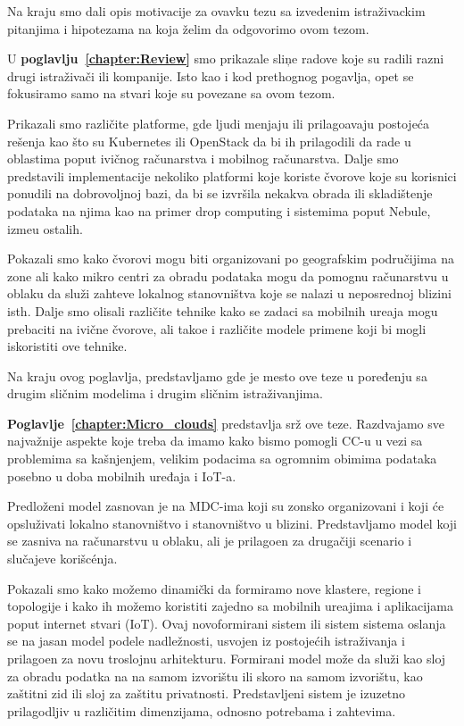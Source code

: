 Na kraju smo dali opis motivacije za ovavku tezu sa izvedenim istra\v zivackim pitanjima i hipotezama na koja \v zelim da odgovorimo ovom tezom.

U \textbf{poglavlju~\ref{chapter:Review}} smo prikazale sli\c ne radove koje su radili razni drugi istra\v ziva\v ci ili kompanije. Isto kao i kod prethognog pogavlja, opet se fokusiramo samo na stvari koje su povezane sa ovom tezom.

Prikazali smo razli\v cite platforme, gde ljudi menjaju ili prilago\dj avaju postoje\'ca re\v senja kao \v sto su Kubernetes ili OpenStack da bi ih prilagodili da rade u oblastima poput ivi\v cnog ra\v cunarstva i mobilnog ra\v cunarstva. Dalje smo predstavili implementacije nekoliko platformi koje koriste \v cvorove koje su korisnici ponudili na dobrovoljnoj bazi, da bi se izvr\v sila nekakva obrada ili skladi\v stenje podataka na njima kao na primer drop computing i sistemima poput Nebule, izme\dj u ostalih.

Pokazali smo kako \v cvorovi mogu biti organizovani po geografskim podru\v cijima na zone ali kako mikro centri za obradu podataka mogu da pomognu ra\v cunarstvu u oblaku da slu\v zi zahteve lokalnog stanovni\v stva koje se nalazi u neposrednoj blizini isth. Dalje smo olisali razli\v cite tehnike kako se zadaci sa mobilnih ure\dj aja mogu prebaciti na ivi\v cne \v cvorove, ali tako\dj e i razli\v cite modele primene koji bi mogli iskoristiti ove tehnike.

Na kraju ovog poglavlja, predstavljamo gde je mesto ove teze u poređ\dj enju sa drugim sli\v cnim modelima i drugim sli\v cnim istra\v zivanjima.

\textbf{Poglavlje~\ref{chapter:Micro_clouds}} predstavlja sr\v z ove teze. Razdvajamo sve najvažnije aspekte koje treba da imamo kako bismo pomogli CC-u u vezi sa problemima sa kašnjenjem, velikim podacima sa ogromnim obimima podataka posebno u doba mobilnih uređaja i IoT-a.

Predlo\v zeni model zasnovan je na MDC-ima koji su zonsko organizovani i koji \'ce opslu\v zivati lokalno stanovni\v stvo i stanovni\v stvo u blizini. Predstavljamo model koji se zasniva na ra\v cunarstvu u oblaku, ali je prilago\dj en za druga\v ciji scenario i slu\v cajeve kori\v sc\'enja.

Pokazali smo kako mo\v zemo dinami\v cki da formiramo nove klastere, regione i topologije i kako ih možemo koristiti zajedno sa mobilnih ure\dj ajima i aplikacijama poput internet stvari (IoT). Ovaj novoformirani sistem ili sistem sistema oslanja se na jasan model podele nadle\v znosti, usvojen iz postojećih istra\v zivanja i prilago\dj en za novu troslojnu arhitekturu. Formirani model mo\v ze da slu\v zi kao sloj za obradu podatka na na samom izvori\v stu ili skoro na samom izvori\v stu, kao za\v stitni zid ili sloj za za\v stitu privatnosti. Predstavljeni sistem je izuzetno prilagodljiv u razli\v citim dimenzijama, odnosno potrebama i zahtevima.

